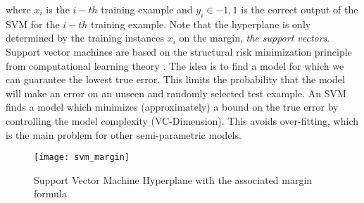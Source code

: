 where $x_i$ is the $i-th$ training example and $y_i \in {-1, 1}$
is the correct output of the SVM for the $i-th$ training
example. Note that the hyperplane is only determined
by the training instances $x_i$ on the margin, \textit{the support vectors}.
Support vector machines are based on the structural
risk minimization principle from computational
learning theory \cite{vapnik1999overview}. The idea is to find a model for which
we can guarantee the lowest true error. This limits
the probability that the model will make an error on
an unseen and randomly selected test example. An
SVM finds a model which minimizes (approximately)
a bound on the true error by controlling the model
complexity (VC-Dimension). This avoids over-fitting,
which is the main problem for other semi-parametric
models.
\begin{figure}[ht]
	\centering
	\texttt{[image: svm\_margin]}
	\caption[Support Vector Machine Hyperplane margin]{Support Vector Machine Hyperplane with the associated margin formula}
	\label{fig:svm_margin}
\end{figure}

